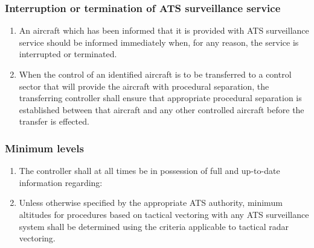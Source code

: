 \subsubsection{Interruption or termination of ATS surveillance service}

\begin{enumerate}
    \item An aircraft which has been informed that it is provided with ATS surveillance service should be informed immediately when, for any reason, the service is interrupted or terminated.
    \item When the control of an identified aircraft is to be transferred to a control sector that will provide the aircraft with procedural separation, the transferring controller shall ensure that appropriate procedural separation is established between that aircraft and any other controlled aircraft before the transfer is effected.
\end{enumerate}

\subsubsection{Minimum levels}

\begin{enumerate}
    \item The controller shall at all times be in possession of full and up-to-date information regarding:
    

    \item Unless otherwise specified by the appropriate ATS authority, minimum altitudes for procedures based on tactical vectoring with any ATS surveillance system shall be determined using the criteria applicable to tactical radar vectoring.
\end{enumerate}

